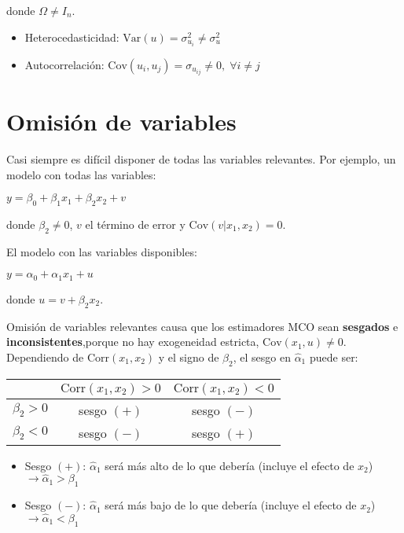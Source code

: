 \documentclass[10pt, a4paper, landscape]{article}
\newcommand{\Var}{\mathrm{Var}}
\newcommand{\Cov}{\mathrm{Cov}}
\newcommand{\Corr}{\mathrm{Corr}}
\begin{document}
\begin{multicols}{3}
		\quad donde $\Omega \neq I_{n}$.
		
		\begin{itemize}[leftmargin=*]
			\item Heterocedasticidad: $\Var(u) = \sigma^{2}_{u_i} \neq \sigma^{2}_{u}$
			\item Autocorrelación: $\Cov(u_{i}, u_{j}) = \sigma_{u_{ij}} \neq 0, \; \forall i \neq j$
		\end{itemize}
		
		\section*{Omisión de variables}
		
		Casi siempre es difícil disponer de todas las variables relevantes. Por ejemplo, un modelo con todas las variables:
		
		\begin{center}
			$y = \beta_{0} + \beta_{1} x_{1} + \beta_{2} x_{2} + v$
		\end{center}
		
		\quad donde $\beta_{2} \neq 0$, $v$ el término de error y $\Cov(v|x_{1},x_{2}) = 0$.
		
		El modelo con las variables disponibles:
		
		\begin{center}
			$y = \alpha_{0} + \alpha_{1} x_{1} + u$
		\end{center}
		
		\quad donde $u = v + \beta_{2} x_{2}$.
		
		Omisión de variables relevantes causa que los estimadores MCO sean \textbf{sesgados} e \textbf{inconsistentes},porque no hay exogeneidad estricta, $\Cov(x_{1}, u) \neq 0$. Dependiendo de $\Corr(x_{1}, x_{2})$ y el signo de $\beta_{2}$, el sesgo en $\hat{\alpha}_{1}$ puede ser:
		
		\begin{center}
			\begin{tabular}{ c | c c }
				                & $\Corr(x_{1}, x_{2}) > 0$ & $\Corr(x_{1}, x_{2}) < 0$ \\ \hline
				$\beta_{2} > 0$ & sesgo $(+)$               & sesgo $(-)$               \\
				$\beta_{2} < 0$ & sesgo $(-)$               & sesgo $(+)$
			\end{tabular}
		\end{center}
		
		\begin{itemize}[leftmargin=*]
			\item Sesgo $(+)$: $\hat{\alpha}_{1}$ será más alto de lo que debería (incluye el efecto de $x_{2}$) $\rightarrow \hat{\alpha}_{1} > \beta_{1}$
			\item Sesgo $(-)$: $\hat{\alpha}_{1}$ será más bajo de lo que debería (incluye el efecto de $x_{2}$) $\rightarrow \hat{\alpha}_{1} < \beta_{1}$
		\end{itemize}
		

\end{multicols}
\end{document}
